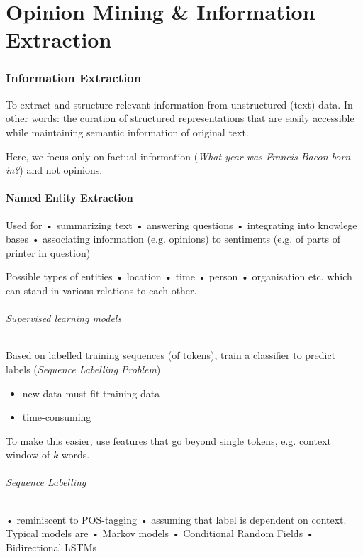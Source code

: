 \documentclass[10pt,twocolumn]{article}
\begin{document}
\pagebreak
\part{Opinion Mining \& Information Extraction}

\section{Information Extraction}

To extract and structure relevant information from unstructured (text) data. In
other words: the curation of structured representations that are easily
accessible while maintaining semantic information of original text.

Here, we focus only on factual information (\textit{What year was Francis Bacon
  born in?}) and not opinions.

\subsection{Named Entity Extraction}

Used for  • summarizing text  • answering questions  • integrating into knowlege
bases  • associating information (e.g. opinions) to sentiments (e.g. of parts
of printer in question)

Possible types of entities  • location  • time  • person  • organisation etc.
which can stand in various relations to each other. 

\paragraph{\textit{Supervised learning models}} Based on labelled training
sequences (of tokens), train a classifier to predict labels (\textit{Sequence
  Labelling Problem})
\begin{itemize}
\item new data must fit training data
\item time-consuming
\end{itemize}

To make this easier, use features that go beyond single tokens, e.g. context
window of $k$ words.

\paragraph{\textit{Sequence Labelling}}  • reminiscent to POS-tagging  • assuming
that label is dependent on context. Typical models are  • Markov models  •
Conditional Random Fields  • Bidirectional LSTMs
\end{document}
